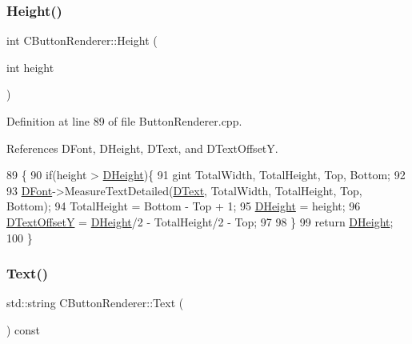 \subsubsection{\texorpdfstring{Height()}{Height()}\hspace{0.1cm}{\footnotesize\ttfamily [2/2]}}
{\footnotesize\ttfamily int C\+Button\+Renderer\+::\+Height (\begin{DoxyParamCaption}\item[{int}]{height }\end{DoxyParamCaption})}



Definition at line 89 of file Button\+Renderer.\+cpp.



References D\+Font, D\+Height, D\+Text, and D\+Text\+OffsetY.


\begin{DoxyCode}
89                                      \{
90     \textcolor{keywordflow}{if}(height > \hyperlink{classCButtonRenderer_a7e3d605b90c45d87ac1396c23c90b250}{DHeight})\{
91         gint TotalWidth, TotalHeight, Top, Bottom;
92         
93         \hyperlink{classCButtonRenderer_adcdace35cb4fac1c90368b7cc86d860a}{DFont}->MeasureTextDetailed(\hyperlink{classCButtonRenderer_a8f058166dec8d1c73adc009e4c436092}{DText}, TotalWidth, TotalHeight, Top, Bottom);
94         TotalHeight = Bottom - Top + 1;
95         \hyperlink{classCButtonRenderer_a7e3d605b90c45d87ac1396c23c90b250}{DHeight} = height;
96         \hyperlink{classCButtonRenderer_a3922fa80775b693fd83e4d5e9f518b23}{DTextOffsetY} = \hyperlink{classCButtonRenderer_a7e3d605b90c45d87ac1396c23c90b250}{DHeight}/2 - TotalHeight/2 - Top;
97         
98     \}
99     \textcolor{keywordflow}{return} \hyperlink{classCButtonRenderer_a7e3d605b90c45d87ac1396c23c90b250}{DHeight};    
100 \}
\end{DoxyCode}
\hypertarget{classCButtonRenderer_ab0ff6bd90e3f7f7a9946c5c3198ed30c}{}\label{classCButtonRenderer_ab0ff6bd90e3f7f7a9946c5c3198ed30c} 
\subsubsection{\texorpdfstring{Text()}{Text()}\hspace{0.1cm}{\footnotesize\ttfamily [1/2]}}
{\footnotesize\ttfamily std\+::string C\+Button\+Renderer\+::\+Text (\begin{DoxyParamCaption}{ }\end{DoxyParamCaption}) const\hspace{0.3cm}{\ttfamily [inline]}}



